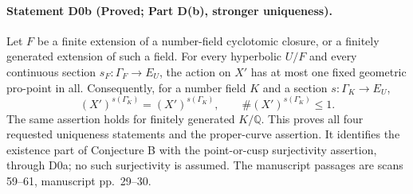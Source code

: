 \paragraph{Statement D0b (Proved; Part D(b), stronger uniqueness).}\label{res:D0b}
Let $F$ be a finite extension of a number-field cyclotomic closure, or a finitely generated extension of such a field. For every hyperbolic $U/F$ and every continuous section $s_F:\Gamma_F\to E_U$, the action on $X'$ has at most one fixed geometric pro-point in all. Consequently, for a number field $K$ and a section $s:\Gamma_K\to E_U$,
\[
 (X')^{s(\Gamma_K^\circ)}=(X')^{s(\Gamma_K)},
 \qquad \#(X')^{s(\Gamma_K^\circ)}\le1.
 \tag{D.1}
\]
The same assertion holds for finitely generated $K/\mathbb Q$. This proves all four requested uniqueness statements and the proper-curve assertion. It identifies the existence part of Conjecture B with the point-or-cusp surjectivity assertion, through D0a; no such surjectivity is assumed. The manuscript passages are scans 59--61, manuscript pp.~29--30.

